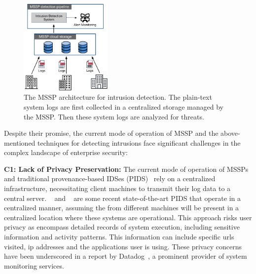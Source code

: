 \begin{figure}[t!]
    \centering
    \includegraphics[width=0.4\textwidth]{fig/mssp.pdf}
    \caption{The MSSP architecture for intrusion detection. The plain-text system logs are first collected in a centralized storage managed by the MSSP. Then these system logs are analyzed for threats.  }
    \label{mssp}
    \vspace{-2ex}
  \end{figure}  


Despite their promise, the current mode of operation of MSSP and the above-mentioned techniques for detecting intrusions face significant challenges in the complex landscape of enterprise security:

\smallskip
\noindent
\textbf{C1: Lack of Privacy Preservation:} The current mode of operation of MSSPs and traditional provenance-based IDSes (PIDS)~\cite{flash2024,cheng2023kairos,wang2022threatrace} rely on a centralized infrastructure, necessitating client machines to transmit their log data to a central server. \flash~\cite{flash2024} and \kairos~\cite{cheng2023kairos} are some recent state-of-the-art PIDS that operate in a centralized manner, assuming the \logs from different machines will be present in a centralized location where these systems are operational. This approach risks user privacy as \logs encompass detailed records of system execution, including sensitive information and activity patterns. This information can include specific urls visited, ip addresses and the applications user is using. These privacy concerns have been underscored in a report by Datadog~\cite{datadog}, a prominent provider of system monitoring services.
    
